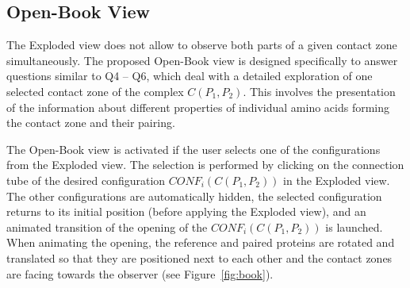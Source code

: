 \documentclass{bmcart}
\def\OpBook {Open-Book view\xspace}
\def\ExpView {Exploded view\xspace}
\begin{document}

\subsection*{Open-Book View}
The \ExpView does not allow to observe both parts of a given contact zone simultaneously.
The proposed \OpBook is designed specifically to answer questions similar to Q4 -- Q6, which deal with a detailed exploration of one selected contact zone of the complex $C(P_1,P_2)$.
This involves the presentation of the information about different properties of individual amino acids forming the contact zone and their pairing.

The \OpBook is activated if the user selects one of the configurations from the \ExpView. 
The selection is performed by clicking on the connection tube of the desired configuration $CONF_i(C(P_1,P_2))$ in the \ExpView.
The other configurations are automatically hidden, the selected configuration returns to its initial position (before applying the \ExpView), and an animated transition of the opening of the $CONF_i(C(P_1,P_2))$ is launched.
When animating the opening, the reference and paired proteins are rotated and translated so that they are positioned next to each other and the contact zones are facing towards the observer (see Figure~\ref{fig:book}). 
\end{document}
